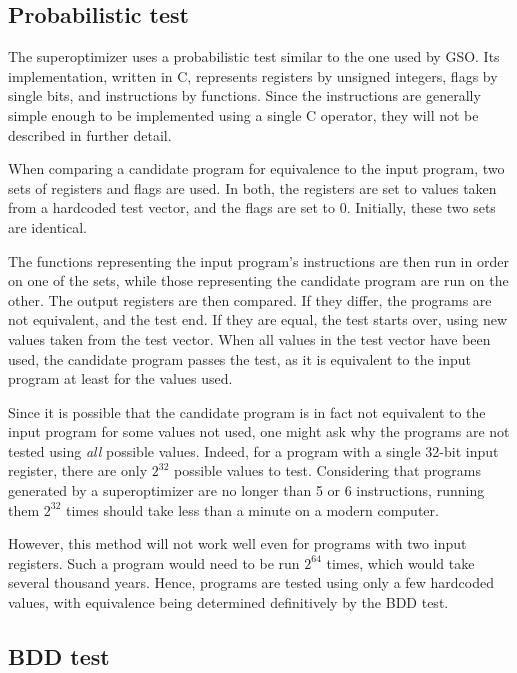 \documentclass[a4paper,11pt]{kth-mag}
\begin{document}
\subsection{Probabilistic test}
\label{ss:probabilistic_test}

The superoptimizer uses a probabilistic test similar to the one used by GSO.
Its implementation, written in C, represents registers by unsigned integers, flags by single bits, and instructions by functions.
Since the instructions are generally simple enough to be implemented using a single C operator, they will not be described in further detail.

When comparing a candidate program for equivalence to the input program, two sets of registers and flags are used.
In both, the registers are set to values taken from a hardcoded test vector, and the flags are set to 0.
Initially, these two sets are identical.

The functions representing the input program's instructions are then run in order on one of the sets, while those representing the candidate program are run on the other.
The output registers are then compared.
If they differ, the programs are not equivalent, and the test end.
If they are equal, the test starts over, using new values taken from the test vector.
When all values in the test vector have been used, the candidate program passes the test, as it is equivalent to the input program at least for the values used.

Since it is possible that the candidate program is in fact not equivalent to the input program for some values not used, one might ask why the programs are not tested using \emph{all} possible values.
Indeed, for a program with a single 32-bit input register, there are only $2^{32}$ possible values to test.
Considering that programs generated by a superoptimizer are no longer than 5 or 6 instructions, running them $2^{32}$ times should take less than a minute on a modern computer.

However, this method will not work well even for programs with two input registers.
Such a program would need to be run $2^{64}$ times, which would take several thousand years.
Hence, programs are tested using only a few hardcoded values, with equivalence being determined definitively by the BDD test.

\subsection{BDD test}
\label{ss:bdd_test}
\end{document}
